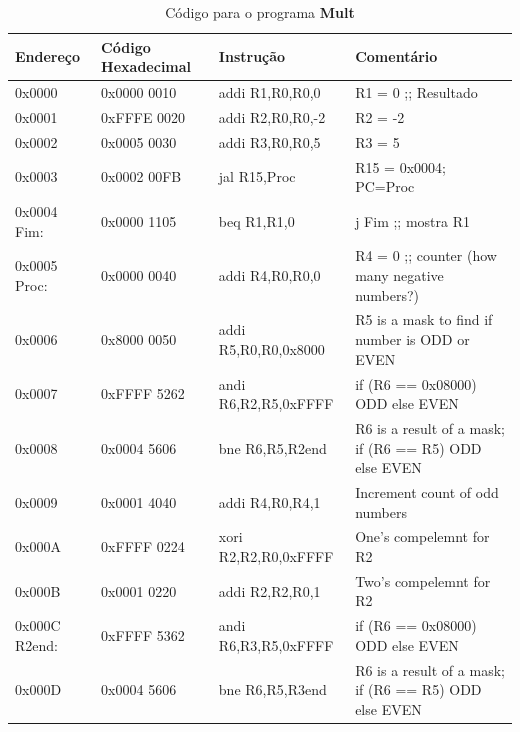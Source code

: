 \documentclass[12pt]{article}
\begin{document}
\begin{table}[H]
    \centering
    \caption{Código para o programa \textbf{Mult}}
    \begin{tabular}{|l|l|l|l|}\hline
        \textbf{Endereço} & \textbf{Código Hexadecimal} & \textbf{Instrução} & \textbf{Comentário}                 \\\hline
        0x0000        & 0x0000 0010 & addi R1,R0,R0,0      & R1 = 0 ;; Resultado                                   \\\hline
        0x0001        & 0xFFFE 0020 & addi R2,R0,R0,-2     & R2 = -2                                               \\\hline
        0x0002        & 0x0005 0030 & addi R3,R0,R0,5      & R3 = 5                                                \\\hline
        0x0003        & 0x0002 00FB & jal  R15,Proc        & R15 = 0x0004; PC=Proc                                 \\\hline
        0x0004 Fim:   & 0x0000 1105 & beq  R1,R1,0         & j Fim ;; mostra R1                                    \\\hline
        0x0005 Proc:  & 0x0000 0040 & addi R4,R0,R0,0      & R4 = 0 ;; counter (how many negative numbers?)        \\\hline
        0x0006        & 0x8000 0050 & addi R5,R0,R0,0x8000 & R5 is a mask to find if number is ODD or EVEN         \\\hline
        0x0007        & 0xFFFF 5262 & andi R6,R2,R5,0xFFFF & if (R6 == 0x08000) ODD else EVEN                      \\\hline
        0x0008        & 0x0004 5606 & bne  R6,R5,R2end     & R6 is a result of a mask; if (R6 == R5) ODD else EVEN \\\hline
        0x0009        & 0x0001 4040 & addi R4,R0,R4,1      & Increment count of odd numbers                        \\\hline
        0x000A        & 0xFFFF 0224 & xori R2,R2,R0,0xFFFF & One's compelemnt for R2                               \\\hline
        0x000B        & 0x0001 0220 & addi R2,R2,R0,1      & Two's compelemnt for R2                               \\\hline
        0x000C R2end: & 0xFFFF 5362 & andi R6,R3,R5,0xFFFF & if (R6 == 0x08000) ODD else EVEN                      \\\hline
        0x000D        & 0x0004 5606 & bne  R6,R5,R3end     & R6 is a result of a mask; if (R6 == R5) ODD else EVEN \\\hline

\end{tabular}
\end{table}
\end{document}
